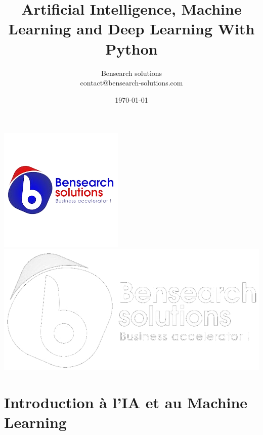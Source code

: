 \documentclass{beamer}
\title{Artificial Intelligence, Machine Learning and Deep Learning With Python}
\author{\color{blue}Bensearch \color{red}solutions\\\color{black} contact@bensearch-solutions.com}
\date{\today}
\begin{document}
	{
	\begin{frame}[plain]
	
		\titlepage
		\includegraphics[scale=0.3]{BensearchLogo-removebg-preview.png}\hfill
			\includegraphics[scale=0.1]{bensearch.png}	
	\end{frame}
}

\section{Introduction à l'IA et au Machine Learning}
\end{document}
